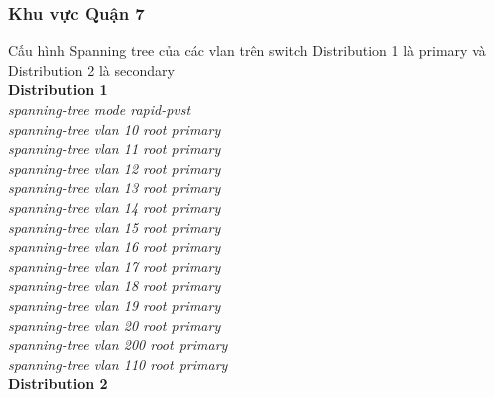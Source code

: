 \documentclass[a4paper, 12pt]{article}
\begin{document}
\subsubsection{Khu vực Quận 7}
\hspace*{1cm}Cấu hình Spanning tree của các vlan trên switch Distribution 1 là primary và Distribution 2 là secondary\\
\hspace*{1cm}\textbf{Distribution 1}\\
\hspace*{2cm}\textit{spanning-tree mode rapid-pvst\\
\hspace*{2cm}spanning-tree vlan 10 root primary\\
\hspace*{2cm}spanning-tree vlan 11 root primary\\
\hspace*{2cm}spanning-tree vlan 12 root primary\\
\hspace*{2cm}spanning-tree vlan 13 root primary\\
\hspace*{2cm}spanning-tree vlan 14 root primary\\
\hspace*{2cm}spanning-tree vlan 15 root primary\\
\hspace*{2cm}spanning-tree vlan 16 root primary\\
\hspace*{2cm}spanning-tree vlan 17 root primary\\
\hspace*{2cm}spanning-tree vlan 18 root primary\\
\hspace*{2cm}spanning-tree vlan 19 root primary\\
\hspace*{2cm}spanning-tree vlan 20 root primary\\
\hspace*{2cm}spanning-tree vlan 200 root primary\\
\hspace*{2cm}spanning-tree vlan 110 root primary\\}
\hspace*{1cm}\textbf{Distribution 2}\\
\end{document}
